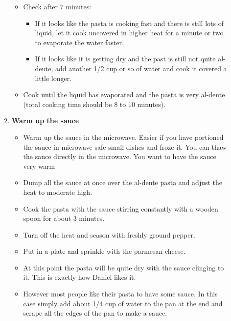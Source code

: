 \documentclass[11pt,letterpaper]{article}
\newcommand \fileName {DanielsPasta}
\begin{document}
\begin{description}
\begin{enumerate}
\begin{itemize}
	\item Check after 7 minutes:
		\begin{itemize} 
			\item If it looks like the pasta is cooking fast and there is still lots of liquid, let it cook uncovered in higher heat for a minute or two to evaporate the water faster. 
			\item If it looks like it is getting dry and the past is still not quite al-dente, add another 1/2 cup or so of water and cook it covered a little longer.
		\end{itemize}
	\item Cook until the liquid has evaporated and the pasta is very al-dente (total cooking time should be 8 to 10 minutes). 
	\end{itemize}
	\item {\bf Warm up the sauce}
	\begin{itemize}
	\item Warm up the sauce in the microwave. Easier if you have portioned the sauce in microwave-safe small dishes and froze it. You can thaw the sauce directly in the microwave. You want to have the sauce very warm
	\item Dump all the sauce at once over the al-dente pasta and adjust the heat to moderate high.
	\item Cook the pasta with the sauce stirring constantly with a wooden spoon for about 3 minutes.
	\item Turn off the heat and season with freshly ground pepper.
	\item Put in a plate and sprinkle with the parmesan cheese.
	\item At this point the pasta will be quite dry with the sauce clinging to it. This is exactly how Daniel likes it.
	\item However most people like their pasta to have some sauce. In this case simply add about 1/4 cup of water to the pan at the end and scrape all the edges of the pan to make a sauce. 
	\end{itemize}
	\end{enumerate}
\end{description}


\end{document}
